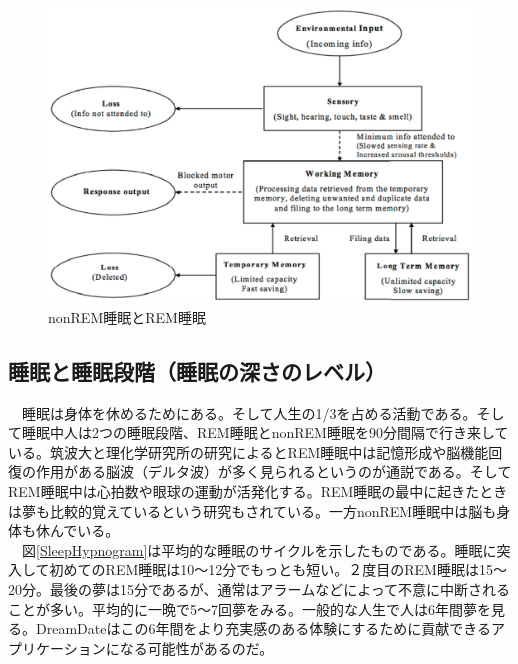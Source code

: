\begin{figure}[htbp]
\begin{center}
\includegraphics[width=15cm]{eps/sleepBrainModel.eps}
\caption{nonREM睡眠とREM睡眠}
\label{brainZhang}
\end{center}
\end{figure}

\subsection{睡眠と睡眠段階（睡眠の深さのレベル）}
　睡眠は身体を休めるためにある。そして人生の1/3を占める活動である。そして睡眠中人は2つの睡眠段階、REM睡眠とnonREM睡眠を90分間隔で行き来している\cite{Dement}。筑波大と理化学研究所の研究によるとREM睡眠中は記憶形成や脳機能回復の作用がある脳波（デルタ波）が多く見られるというのが通説である\cite{tsukuba}。そしてREM睡眠中は心拍数や眼球の運動が活発化する。REM睡眠の最中に起きたときは夢も比較的覚えているという研究もされている\cite{remNonRem}。一方nonREM睡眠中は脳も身体も休んでいる。\\
　図\ref{SleepHypnogram}は平均的な睡眠のサイクルを示したものである\cite{hypnogram}。睡眠に突入して初めてのREM睡眠は10〜12分でもっとも短い。２度目のREM睡眠は15〜20分。最後の夢は15分であるが、通常はアラームなどによって不意に中断されることが多い。平均的に一晩で5〜7回夢をみる。一般的な人生で人は6年間夢を見る。DreamDateはこの6年間をより充実感のある体験にするために貢献できるアプリケーションになる可能性があるのだ。

